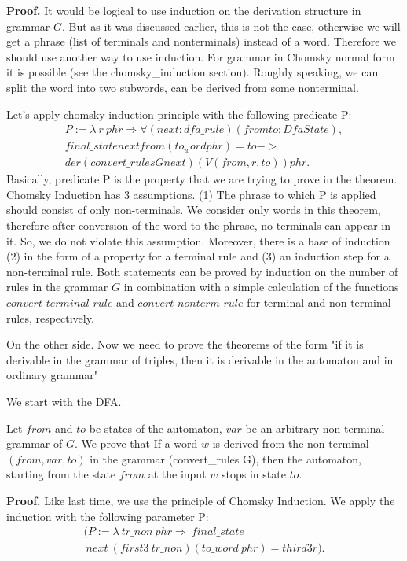 \textbf{Proof.}
It would be logical to use induction on the derivation structure in grammar $G$. But as it was discussed earlier, this is not the case, otherwise we will get a phrase (list of terminals and nonterminals) instead of a word. Therefore we should use another way to use induction. For grammar in Chomsky normal form it is possible (see the chomsky\_induction section). Roughly speaking, we can split the word into two subwords,  can be derived from some nonterminal.

Let's apply chomsky induction principle with the following predicate P:
\begin{align*}
  P :=  \lambda \ r \ phr \Rightarrow \forall (next : dfa\_rule) (from to : DfaState), \\
           final\_state next from (to_word phr) = to -> \\
            der (convert\_rules G next) (V (from, r, to)) phr.
\end{align*}
Basically, predicate P is the property that we are trying to prove in the theorem. Chomsky Induction has 3 assumptions.
(1) The phrase to which P is applied should consist of only non-terminals. We consider only words in this theorem, therefore after conversion of the word to the phrase, no terminals can appear in it. So, we do not violate this assumption.
Moreover, there is a base of induction (2) in the form of a property for a terminal rule and (3) an induction step for a non-terminal rule.
Both statements can be proved by induction on the number of rules in the grammar $G$ in combination with a simple calculation of the functions $convert\_terminal\_rule$ and $convert\_nonterm\_rule$ for terminal and non-terminal rules, respectively.

On the other side. Now we need to prove the theorems of the form "if it is derivable in the grammar of triples, then it is derivable in the automaton and in ordinary grammar"

We start with the DFA.
\begin{theorem}
	Let $from$ and $to$ be states of the automaton, $var$ be an arbitrary non-terminal grammar of $G$. We prove that If a word $w$ is derived from the non-terminal $(from, var, to)$ in the grammar (convert\_rules G), then the automaton, starting from the state $from$ at the input $w$ stops in state $to$.
\end{theorem}
\textbf{Proof.} 
Like last time, we use the principle of Chomsky Induction.
We apply the induction with the following parameter P:
\begin{align*}
(P :=  \lambda \ tr\_non \ phr \Rightarrow \ final\_state \ \ \ \ \ \ \ \ \ \ \ \ \ \ \ \ \ \ \ \  \\ 
\ next \ (first3 \ tr\_non) (to\_word \ phr) = third3 r). 
\end{align*}


